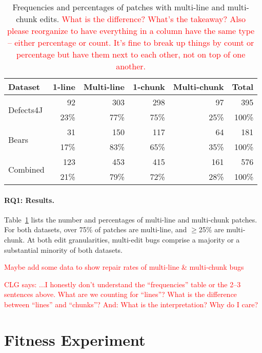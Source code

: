 \documentclass[sigconf, timestamp-false, anonymous=true]{acmart}
\newcommand\todo[1]{\textcolor{red}{#1}}
\begin{document}
\begin{table}
{\begin{center}
	\begin{tabular}{l | rrrr | r}
		\toprule
		Dataset & 1-line & Multi-line & 1-chunk & Multi-chunk & Total \\
		\midrule
		\multirow{ 2}{*}{Defects4J} & 92 & 303 & 298 & 97 & 395 \\
		& 23\% & 77\% & 75\% & 25\% & 100\% \\
		\multirow{ 2}{*}{Bears} & 31 & 150 & 117 & 64 & 181 \\
		& 17\% & 83\% & 65\% & 35\% & 100\% \\
		\midrule
		\multirow{ 2}{*}{Combined} & 123 & 453 & 415 & 161 & 576 \\
		& 21\% & 79\% & 72\% & 28\% & 100\% \\
		\bottomrule
	\end{tabular}
 \end{center}
}
	\caption{Frequencies and percentages of patches with multi-line and
          multi-chunk edits. \todo{What is the difference? What's the takeaway?
            Also please reorganize to have everything in a column have the same
            type -- either percentage or count. It's fine to break up things by
            count or percentage but have them next to each other, not on top of
            one another.}}
	\label{tab:multiedit-frequencies}
\end{table}

\paragraph{RQ1: Results.} 
Table~\ref{tab:multiedit-frequencies} lists the number and percentages of
multi-line and multi-chunk patches. For both datasets, over 75\% of patches are multi-line, 
and $\geq$25\% are multi-chunk. At both edit granularities, multi-edit bugs 
comprise a majority or a substantial minority of both datasets.

\todo{Maybe add some data to show repair rates of multi-line \& multi-chunk bugs}

\todo{CLG says: ...I honestly don't understand the ``frequencies'' table or the
  2--3 sentences above. What are we counting for ``lines''? What is the
  difference between ``lines'' and ``chunks''? And: What is the interpretation?
  Why do I care?}

\section{Fitness Experiment}
\end{document}

